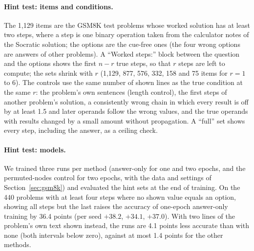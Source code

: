 \paragraph{Hint test: items and conditions.} The 1,129 items are the GSM8K test problems whose worked solution has at
least two steps, where a step is one binary operation taken from the calculator notes of the Socratic solution; the
options are the cue-free ones (the four wrong options are answers of other problems). A ``Worked steps:'' block
between the question and the options shows the first $n - r$ true steps, so that $r$ steps are left to compute; the
sets shrink with $r$ (1,129, 877, 576, 332, 158 and 75 items for $r = 1$ to 6). The controls use the same number of
shown lines as the true condition at the same $r$: the problem's own sentences (length control), the first steps of
another problem's solution, a consistently wrong chain in which every result is off by at least 1.5 and later
operands follow the wrong values, and the true operands with results changed by a small amount without propagation.
A ``full'' set shows every step, including the answer, as a ceiling check.

\paragraph{Hint test: models.} We trained three runs per method (answer-only for one and two epochs, \tf{} and the
permuted-nodes control for two epochs, with the data and settings of Section~\ref{sec:gsm8k}) and evaluated the hint sets at
the end of training. On the 440 problems with at least four steps where no shown value equals an option, showing all
steps but the last raises the accuracy of one-epoch answer-only training by 36.4 points (per seed $+38.2$, $+34.1$,
$+37.0$). With two lines of the problem's own text shown instead, the \tf{} runs are 4.1 points less accurate than with
none (both intervals below zero), against at most 1.4 points for the other methods.

